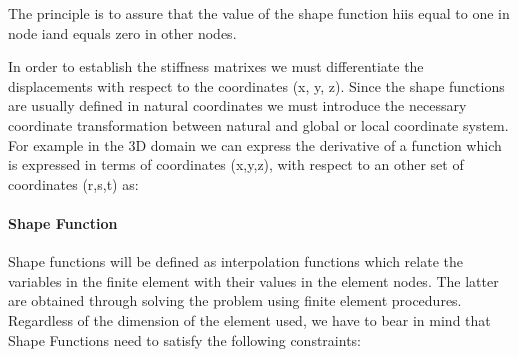 The principle is to assure that the value of the shape function hiis equal to one in node iand equals zero in other nodes.

In order to establish the stiffness matrixes we must differentiate the displacements with respect to the coordinates (x, y, z). Since the shape functions are usually defined in natural coordinates we must introduce the necessary coordinate transformation between natural and global or local coordinate system. For example in the 3D domain we can express the derivative of a function which is expressed in terms of coordinates (x,y,z), with respect to an other set of coordinates (r,s,t) as:


\paragraph{Shape Function}
Shape functions will be defined as interpolation functions which relate the variables in the finite element with their values in the element nodes. The latter are obtained through solving the problem using finite element procedures.
Regardless of the dimension of the element used, we have to bear in mind that Shape Functions need to satisfy the following constraints:
